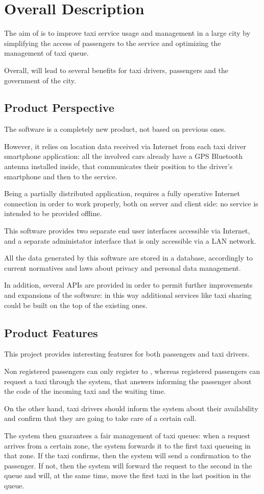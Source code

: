 \section{Overall Description}
The aim of \myTaxiService{} is to improve taxi service usage and management in a large city by simplifying the access of passengers to the service and optimizing the management of taxi queue.\par
Overall, \myTaxiService{} will lead to several benefits for taxi drivers, passengers and the government of the city.
\subsection{Product Perspective}
The software \myTaxiService{} is a completely new product, not based on previous ones.\par
However, it relies on location data received via Internet from each taxi driver smartphone application: all the involved cars already have a GPS Bluetooth antenna installed inside, that communicates their position to the driver's smartphone and then to the service.\par
Being a partially distributed application, \myTaxiService{} requires a fully operative Internet connection in order to work properly, both on server and client side: no service is intended to be provided offline.\par
This software provides two separate end user interfaces accessible via Internet, and a separate administator interface that is only accessible via a LAN network.\par
All the data generated by this software are stored in a database, accordingly to current normatives and laws about privacy and personal data management.\par
In addition, several APIs are provided in order to permit further improvements and expansions of the software: in this way additional services like taxi sharing could be built on the top of the existing ones.
\showGeneralDiagram{}
\subsection{Product Features}
This project provides interesting features for both passengers and taxi drivers.\par
Non registered passengers can only register to \myTaxiService{}, whereas registered passengers can request a taxi through the system, that answers informing the passenger about the code of the incoming taxi and the waiting time.\par
On the other hand, taxi drivers should inform the system about their availability and confirm that they are going to take care of a certain call.\par
The system then guarantees a fair management of taxi queues: when a request arrives from a certain zone, the system forwards it to the first taxi queueing in that zone.
If the taxi confirms, then the system will send a confirmation to the passenger.
If not, then the system will forward the request to the second in the queue and will, at the same time, move the first taxi in the last position in the queue.
